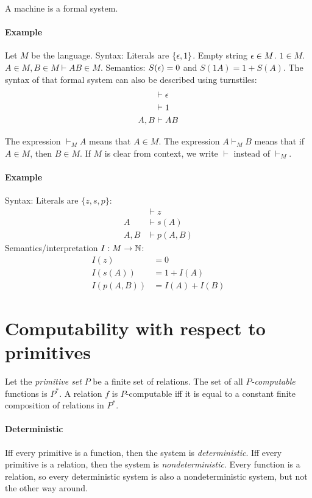 A machine is a formal system.

\paragraph{Example}
Let \(M\) be the language.
Syntax:
Literals are \(\{\epsilon, 1\}\).
Empty string \(\epsilon \in M\).
\(1 \in M\).
\(A \in M, B \in M \vdash AB \in M\).
Semantics: \(S(\epsilon) = 0\) and \(S(1A) = 1 + S(A)\).
The syntax of that formal system can also be described using turnstiles:
\begin{align*}
    &\vdash \epsilon
    \\
    &\vdash 1
    \\
    A,B &\vdash AB
\end{align*}

The expression \(\vdash_M A\) means that \(A \in M\).
The expression \(A \vdash_M B\) means that if \(A \in M\), then \(B \in M\).
If \(M\) is clear from context, we write \(\vdash\) instead of \(\vdash_M\).

\paragraph{Example}
Syntax:
Literals are \(\{z,s,p\}\):
\begin{align*}
    &\vdash z
    \\
    A &\vdash s(A)
    \\
    A,B &\vdash p(A,B)
\end{align*}
Semantics/interpretation \(I : M \to \mathbb{N}\):
\begin{align*}
    I(z) &= 0
    \\
    I(s(A)) &= 1 + I(A)
    \\
    I(p(A,B)) &= I(A) + I(B)
\end{align*}

\section{Computability with respect to primitives}

Let the \emph{primitive set} \(P\) be a finite set of relations.
The set of all \emph{\(P\)-computable} functions is \(P^*\).
A relation \(f\) is \(P\)-computable iff it is equal to
a constant finite composition of relations in \(P^*\).

\paragraph{Deterministic}
Iff every primitive is a function,
then the system is \emph{deterministic}.
Iff every primitive is a relation,
then the system is \emph{nondeterministic}.
Every function is a relation,
so every deterministic system is also a nondeterministic system,
but not the other way around.

